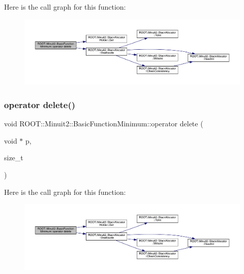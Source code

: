Here is the call graph for this function\+:
\nopagebreak
\begin{figure}[H]
\begin{center}
\leavevmode
\includegraphics[width=350pt]{de/d25/classROOT_1_1Minuit2_1_1BasicFunctionMinimum_ab9d53fd0c21ac6456afdb233e4cbaf1b_cgraph}
\end{center}
\end{figure}
\mbox{\label{classROOT_1_1Minuit2_1_1BasicFunctionMinimum_ab9d53fd0c21ac6456afdb233e4cbaf1b}} 
\subsubsection{\texorpdfstring{operator delete()}{operator delete()}\hspace{0.1cm}{\footnotesize\ttfamily [2/2]}}
{\footnotesize\ttfamily void R\+O\+O\+T\+::\+Minuit2\+::\+Basic\+Function\+Minimum\+::operator delete (\begin{DoxyParamCaption}\item[{void $\ast$}]{p,  }\item[{size\+\_\+t}]{ }\end{DoxyParamCaption})\hspace{0.3cm}{\ttfamily [inline]}}

Here is the call graph for this function\+:
\nopagebreak
\begin{figure}[H]
\begin{center}
\leavevmode
\includegraphics[width=350pt]{de/d25/classROOT_1_1Minuit2_1_1BasicFunctionMinimum_ab9d53fd0c21ac6456afdb233e4cbaf1b_cgraph}
\end{center}
\end{figure}
\mbox{\label{classROOT_1_1Minuit2_1_1BasicFunctionMinimum_a49a32bdb3ff21202fcfa9a9e42015b8f}} 
